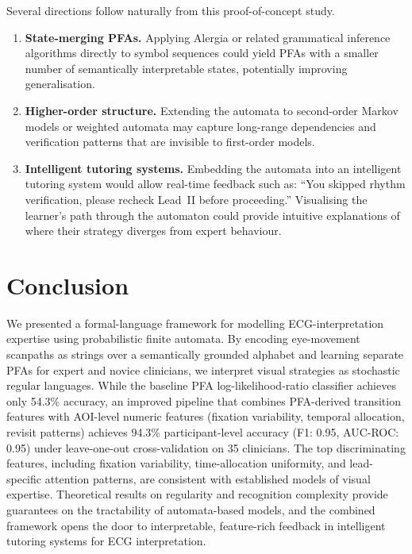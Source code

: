 \documentclass[sigconf]{acmart}
\theoremstyle{plain}
\theoremstyle{definition}
\begin{document}
Several directions follow naturally from this proof-of-concept study.
\begin{enumerate}
    \item \textbf{State-merging PFAs.}
    Applying Alergia or related grammatical inference algorithms directly to symbol sequences could yield PFAs with a smaller number of semantically interpretable states, potentially improving generalisation.
    \item \textbf{Higher-order structure.}
    Extending the automata to second-order Markov models or weighted automata may capture long-range dependencies and verification patterns that are invisible to first-order models.
    \item \textbf{Intelligent tutoring systems.}
    Embedding the automata into an intelligent tutoring system would allow real-time feedback such as:
    ``You skipped rhythm verification, please recheck Lead~II before proceeding.''
    Visualising the learner's path through the automaton could provide intuitive explanations of where their strategy diverges from expert behaviour.
\end{enumerate}

\section{Conclusion}

We presented a formal-language framework for modelling ECG-interpretation expertise using probabilistic finite automata.
By encoding eye-movement scanpaths as strings over a semantically grounded alphabet and learning separate PFAs for expert and novice clinicians, we interpret visual strategies as stochastic regular languages.
While the baseline PFA log-likelihood-ratio classifier achieves only 54.3\% accuracy, an improved pipeline that combines PFA-derived transition features with AOI-level numeric features (fixation variability, temporal allocation, revisit patterns) achieves 94.3\% participant-level accuracy (F1: 0.95, AUC-ROC: 0.95) under leave-one-out cross-validation on 35 clinicians.
The top discriminating features, including fixation variability, time-allocation uniformity, and lead-specific attention patterns, are consistent with established models of visual expertise.
Theoretical results on regularity and recognition complexity provide guarantees on the tractability of automata-based models, and the combined framework opens the door to interpretable, feature-rich feedback in intelligent tutoring systems for ECG interpretation.
\end{document}
